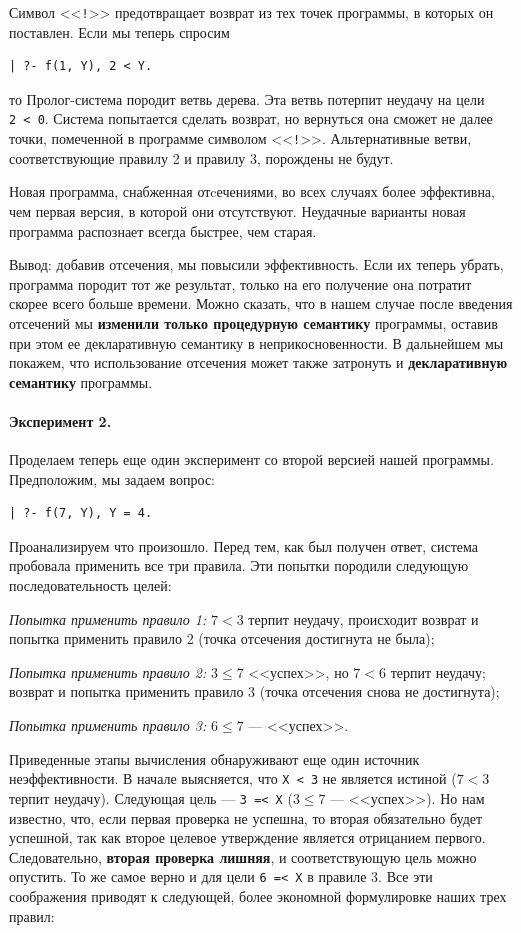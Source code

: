 \documentclass[12pt, openany, twoside]{book} %
\begin{document}
Символ <<{\tt !}>> предотвращает возврат из тех точек программы, в которых он поставлен. Если мы теперь спросим
{\tt \begin{verbatim}
| ?- f(1, Y), 2 < Y.
\end{verbatim}}
\noindent то Пролог-система породит ветвь дерева. Эта ветвь потерпит неудачу на цели {\tt 2~<~0}. Система попытается сделать возврат, но вернуться она сможет не далее точки, помеченной в программе символом <<{\tt !}>>. Альтернативные ветви, соответствующие правилу 2 и правилу 3, порождены не будут.

Новая программа, снабженная отcечениями, во всех случаях более эффективна, чем первая версия, в которой они отсутствуют. Неудачные варианты новая программа распознает всегда быстрее, чем старая.

Вывод: добавив отсечения, мы повысили эффективность. Если их теперь убрать, программа породит тот же результат, только на его получение она потратит скорее всего больше времени. Можно сказать, что в нашем случае после введения отсечений мы {\bf изменили только процедурную семантику} программы, оставив при этом ее декларативную семантику в неприкосновенности. В дальнейшем мы покажем, что использование отсечения может также затронуть и {\bf декларативную семантику} программы.

\paragraph{Эксперимент 2.} Проделаем теперь еще один эксперимент со второй версией нашей программы. Предположим, мы задаем вопрос:
{\tt \begin{verbatim}
| ?- f(7, Y), Y = 4.
\end{verbatim}}
\noindent Проанализируем что произошло. Перед тем, как был получен ответ, система пробовала применить все три правила. Эти попытки породили следующую последовательность целей:

\emph{Попытка применить правило 1:}
$7 < 3$ терпит неудачу, происходит возврат и попытка применить правило 2 (точка отсечения достигнута не была);

\emph{Попытка применить правило 2:} $3\leq 7$ <<успех>>, но $7 < 6$ терпит неудачу; возврат и попытка применить правило 3 (точка отсечения снова не достигнута);

\emph{Попытка применить правило 3:} {$6\leq 7$} --- <<успех>>.

Приведенные этапы вычисления обнаруживают еще один источник неэффективности. В начале выясняется, что {\tt X < 3} не является истиной ($7 < 3$ терпит неудачу). Следующая цель --- {\tt 3~=<~X} ($3 \leq 7$ ---  <<успех>>). Но нам известно, что, если первая проверка не успешна, то вторая обязательно будет успешной, так как второе целевое утверждение является отрицанием первого. Следовательно, {\bf вторая проверка лишняя}, и соответствующую цель можно опустить. То же самое верно и для цели {\tt 6~=<~X} в правиле 3. Все эти соображения приводят к следующей, более экономной формулировке наших трех правил:
\end{document}
